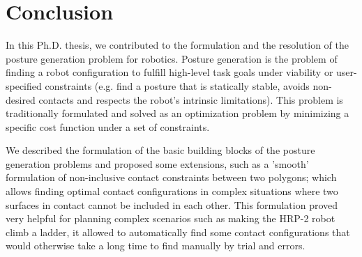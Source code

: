 

\chapter*{Conclusion}
\label{cha:conclusion}

In this Ph.D. thesis, we contributed to the formulation and the resolution of the posture generation problem for robotics.
Posture generation is the problem of finding a robot configuration to fulfill high-level task goals under viability or user-specified constraints (e.g. find a posture that is statically stable, avoids non-desired contacts and respects the robot's intrinsic limitations).
This problem is traditionally formulated and solved as an optimization problem by minimizing a specific cost function under a set of constraints.

We described the formulation of the basic building blocks of the posture generation problems and proposed some extensions, such as a 'smooth' formulation of non-inclusive contact constraints between two polygons; which allows finding optimal contact configurations in complex situations where two surfaces in contact cannot be included in each other.
This formulation proved very helpful for planning complex scenarios such as making the HRP-2 robot climb a ladder, it allowed to automatically find some contact configurations that would otherwise take a long time to find manually by trial and errors.

